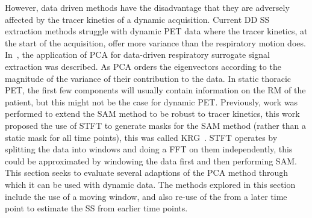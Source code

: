             However, data driven methods have the disadvantage that they are adversely affected by the tracer kinetics of a dynamic acquisition. Current \gls{DD} \gls{SS} extraction methods struggle with dynamic \gls{PET} data where the tracer kinetics, at the start of the acquisition, offer more variance than the respiratory motion does. In~, the application of \gls{PCA} for data-driven respiratory surrogate signal extraction was described. As \gls{PCA} orders the eigenvectors according to the magnitude of the variance of their contribution to the data. In static thoracic \gls{PET}, the first few components will usually contain information on the \gls{RM} of the patient, but this might not be the case for dynamic \gls{PET}. Previously, work was performed to extend the \gls{SAM} method to be robust to tracer kinetics, this work proposed the use of \gls{STFT} to generate masks for the \gls{SAM} method (rather than a static mask for all time points), this was called \gls{KRG}~. \gls{STFT} operates by splitting the data into windows and doing a \gls{FFT} on them independently, this could be approximated by windowing the data first and then performing \gls{SAM}. This section seeks to evaluate several adaptions of the \gls{PCA} method through which it can be used with dynamic data. The methods explored in this section include the use of a moving window, and also re-use of the  from a later time point to estimate the \gls{SS} from earlier time points.
        
